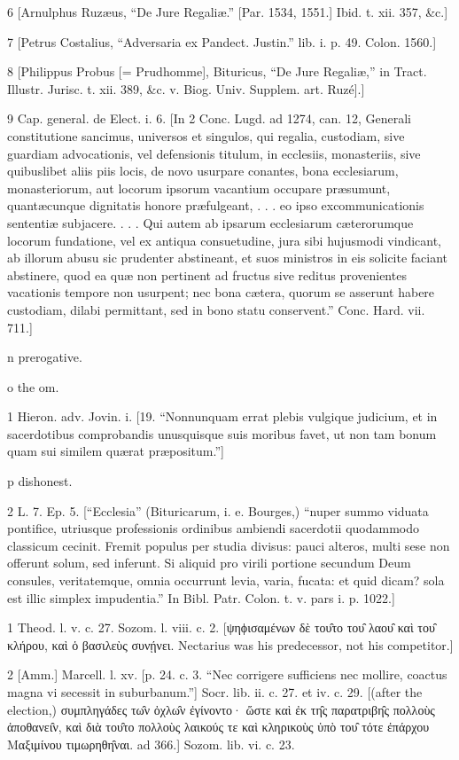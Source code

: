 6
[Arnulphus Ruzæus, “De Jure Regaliæ.” [Par. 1534, 1551.] Ibid. t. xii. 357, &c.]

7
[Petrus Costalius, “Adversaria ex Pandect. Justin.” lib. i. p. 49. Colon. 1560.]

8
[Philippus Probus [= Prudhomme], Bituricus, “De Jure Regaliæ,” in Tract. Illustr. Jurisc. t. xii. 389, &c. v. Biog. Univ. Supplem. art. Ruzé].]

9
Cap. general. de Elect. i. 6. [In 2 Conc. Lugd. ad 1274, can. 12, Generali constitutione sancimus, universos et singulos, qui regalia, custodiam, sive guardiam advocationis, vel defensionis titulum, in ecclesiis, monasteriis, sive quibuslibet aliis piis locis, de novo usurpare conantes, bona ecclesiarum, monasteriorum, aut locorum ipsorum vacantium occupare præsumunt, quantæcunque dignitatis honore præfulgeant, . . . eo ipso excommunicationis sententiæ subjacere. . . . Qui autem ab ipsarum ecclesiarum cæterorumque locorum fundatione, vel ex antiqua consuetudine, jura sibi hujusmodi vindicant, ab illorum abusu sic prudenter abstineant, et suos ministros in eis solicite faciant abstinere, quod ea quæ non pertinent ad fructus sive reditus provenientes vacationis tempore non usurpent; nec bona cætera, quorum se asserunt habere custodiam, dilabi permittant, sed in bono statu conservent.” Conc. Hard. vii. 711.]

n
prerogative.

o
the om.

1
Hieron. adv. Jovin. i. [19. “Nonnunquam errat plebis vulgique judicium, et in sacerdotibus comprobandis unusquisque suis moribus favet, ut non tam bonum quam sui similem quærat præpositum.”]

p
dishonest.

2
L. 7. Ep. 5. [“Ecclesia” (Bituricarum, i. e. Bourges,) “nuper summo viduata pontifice, utriusque professionis ordinibus ambiendi sacerdotii quodammodo classicum cecinit. Fremit populus per studia divisus: pauci alteros, multi sese non offerunt solum, sed inferunt. Si aliquid pro virili portione secundum Deum consules, veritatemque, omnia occurrunt levia, varia, fucata: et quid dicam? sola est illic simplex impudentia.” In Bibl. Patr. Colon. t. v. pars i. p. 1022.]

1
Theod. l. v. c. 27. Sozom. l. viii. c. 2. [ψηϕισαμένων δὲ του̑το του̑ λαου̑ καὶ του̑ κλήρου, καὶ ὁ βασιλεὺς συνῄνει. Nectarius was his predecessor, not his competitor.]

2
[Amm.] Marcell. l. xv. [p. 24. c. 3. “Nec corrigere sufficiens nec mollire, coactus magna vi secessit in suburbanum.”] Socr. lib. ii. c. 27. et iv. c. 29. [(after the election,) συμπληγάδες τω̑ν ὀχλω̑ν ἐγίνοντο· ὥστε καὶ ἐκ τη̑ς παρατριβη̑ς πολλοὺς ἀποθανει̑ν, καὶ διὰ του̑το πολλοὺς λαικούς τε καὶ κληρικοὺς ὑπὸ του̑ τότε ἐπάρχου Μαξιμίνου τιμωρηθη̑ναι. ad 366.] Sozom. lib. vi. c. 23.

